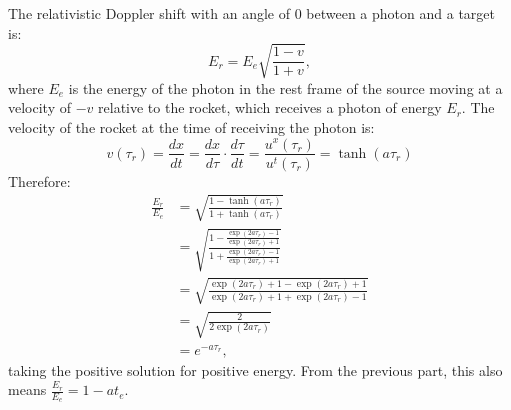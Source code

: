 \documentclass[a4paper]{article}
\begin{document}
The relativistic Doppler shift with an angle of $0$ between a photon and a target is:
$$E_r = E_e\sqrt{\frac{1 - v}{{1 + v}}},$$
where $E_e$ is the energy of the photon in the rest frame of the source moving at a velocity of $-v$ relative to the rocket, which receives a photon of energy $E_r$.
The velocity of the rocket at the time of receiving the photon is:
$$v(\tau_r) = \frac{dx}{dt} = \frac{dx}{d\tau} \cdot \frac{d\tau}{dt} = \frac{u^x(\tau_r)}{u^t(\tau_r)} = \tanh(a\tau_r)$$
Therefore:
\begin{align*}
	\frac{E_r}{E_e} &= \sqrt{\frac{1 - \tanh(a\tau_r)}{{1 + \tanh(a\tau_r)}}}\\
	&=  \sqrt{\frac{1- \frac{\exp({2a\tau_r}) - 1}{\exp({2a\tau_r}) + 1}}{1 + \frac{\exp({2a\tau_r}) - 1}{\exp({2a\tau_r}) + 1}}}\\
	&=  \sqrt{\frac{\exp({2a\tau_r}) + 1 - \exp({2a\tau_r}) + 1}{\exp({2a\tau_r}) + 1 + \exp({2a\tau_r}) - 1}}\\
	&=  \sqrt{\frac{2}{2\exp({2a\tau_r})}}\\
	&=  e^{-a\tau_r},
\end{align*}
taking the positive solution for positive energy.
From the previous part, this also means $ \frac{E_r}{E_e} = 1 - a t_e$.
\end{document}
